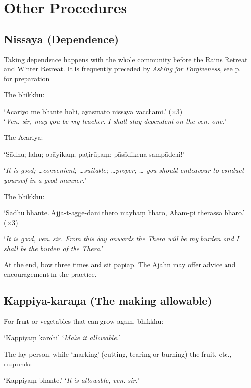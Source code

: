 \chapter{Other Procedures}

\section{Nissaya (Dependence)}
\label{nissaya}

Taking dependence happens with the whole community before the Rains Retreat and
Winter Retreat. It is frequently preceded by \emph{Asking for Forgiveness}, see
p.\pageref{asking-forgiveness} for preparation.

The bhikkhu:

‘Ācariyo me bhante hohi, āyasmato nissāya vacchāmi.’ (×3)\\
‘\emph{Ven. sir, may you be my teacher. I shall stay dependent on the ven. one.}’

The Ācariya:

‘Sādhu; lahu; opāyikaṃ; paṭirūpaṃ; pāsādikena sampādehi!’

‘\emph{It is good; …convenient; …suitable; …proper; … you should endeavour to
  conduct yourself in a good manner.}’


The bhikkhu:

‘Sādhu bhante. Ajja-t-agge-dāni thero mayhaṃ bhāro, Aham-pi therassa bhāro.’ (×3)

‘\emph{It is good, ven. sir. From this day onwards the Thera will be my burden and I
shall be the burden of the Thera.}’


At the end, bow three times and sit papiap. The Ajahn may offer advice and
encouragement in the practice.

\section{Kappiya-karaṇa (The making allowable)}

For fruit or vegetables that can grow again, bhikkhu:

‘Kappiyaṃ karohi’ ‘\emph{Make it allowable.}’

The lay-person, while ‘marking’ (cutting, tearing or burning) the fruit, etc., responds:

‘Kappiyaṃ bhante.’ ‘\emph{It is allowable, ven. sir.}’ 


